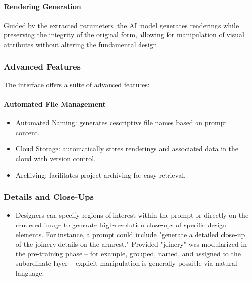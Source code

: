 \documentclass[12pt]{article}
\begin{document}
\paragraph{Rendering Generation}
Guided by the extracted parameters, the AI model generates renderings while preserving the integrity of the original form, allowing for manipulation of visual attributes without altering the fundamental design.

\subsubsection{Advanced Features}
The interface offers a suite of advanced features:

\paragraph{Automated File Management}

\begin{itemize}
    \item Automated Naming: generates descriptive file names based on prompt content.
    \item Cloud Storage: automatically stores renderings and associated data in the cloud with version control.
    \item Archiving: facilitates project archiving for easy retrieval.
\end{itemize}


\subsubsection{Details and Close-Ups}
\begin{itemize} 
    \item Designers can specify regions of interest within the prompt or directly on the rendered image to generate high-resolution close-ups of specific design elements. For instance, a prompt could include "generate a detailed close-up of the joinery details on the armrest." Provided "joinery" was modularized in the pre-training phase -- for example, grouped, named, and assigned to the subordinate layer -- explicit manipulation is generally possible via natural language.
\end{itemize} 
\end{document}

